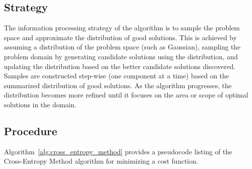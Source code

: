 \subsection{Strategy}
The information processing strategy of the algorithm is to sample the problem space and approximate the distribution of good solutions.
This is achieved by assuming a distribution of the problem space (such as Gaussian), sampling the problem domain by generating candidate solutions using the distribution, and updating the distribution based on the better candidate solutions discovered. Samples are constructed step-wise (one component at a time) based on the summarized distribution of good solutions. As the algorithm progresses, the distribution becomes more refined until it focuses on the area or scope of optimal solutions in the domain.

\subsection{Procedure}
Algorithm~\ref{alg:cross_entropy_method} provides a pseudocode listing of the Cross-Entropy Method algorithm for minimizing a cost function.

